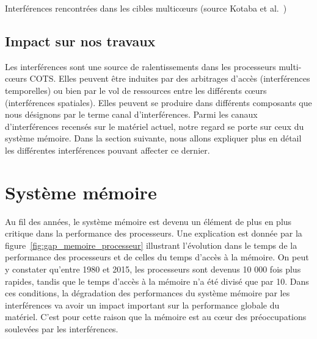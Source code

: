 \begin{savenotes}
\begin{table}[!ht]
	\centering
	\resizebox{\linewidth}{!}{
		
	}
	\caption{\label{table:canaux_interferences}Interférences rencontrées dans les cibles multicœurs (source Kotaba et al.~\cite{kotaba2013multicore})}
\end{table}
\end{savenotes}

\subsection{Impact sur nos travaux}

Les interférences sont une source de ralentissements dans les processeurs multi-cœurs COTS.
Elles peuvent être induites par des arbitrages d'accès (interférences temporelles) ou bien par le vol de ressources entre les différents cœurs (interférences spatiales).
Elles peuvent se produire dans différents composants que nous désignons par le terme canal d'interférences.
Parmi les canaux d'interférences recensés sur le matériel actuel, notre regard se porte sur ceux du système mémoire.
Dans la section suivante, nous allons expliquer plus en détail les différentes interférences pouvant affecter ce dernier.

\section{Système mémoire}

Au fil des années, le système mémoire est devenu un élément de plus en plus critique dans la performance des processeurs.
Une explication est donnée par la figure~\ref{fig:gap_memoire_processeur} illustrant l'évolution dans le temps de la performance des processeurs et de celles du temps d'accès à la mémoire.
On peut y constater qu'entre 1980 et 2015, les processeurs sont devenus 10 000 fois plus rapides, tandis que le temps d'accès à la mémoire n'a été divisé que par 10.
Dans ces conditions, la dégradation des performances du système mémoire par les interférences va avoir un impact important sur la performance globale du matériel.
C'est pour cette raison que la mémoire est au cœur des préoccupations soulevées par les interférences.

